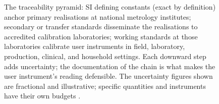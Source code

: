 \begin{figure}[htbp]
\begin{tikzpicture}[
  level/.style={draw=engblack, minimum height=0.9cm, align=center,
    font=\small},
  arrow/.style={-{Stealth}, very thick, draw=engblack!70},
]
\end{tikzpicture}
\caption[Traceability pyramid]{The traceability pyramid: SI
defining constants (exact by definition) anchor primary realisations
at national metrology institutes; secondary or transfer standards
disseminate the realisations to accredited calibration laboratories;
working standards at those laboratories calibrate user instruments
in field, laboratory, production, clinical, and household settings.
Each downward step adds uncertainty; the documentation of the chain
is what makes the user instrument's reading defensible. The
uncertainty figures shown are fractional and illustrative; specific
quantities and instruments have their own budgets
\cite{std:bipm-si2019, std:bipm-cipm-mra}.}
\label{fig:vol01:ch03:traceability-pyramid}
\end{figure}
